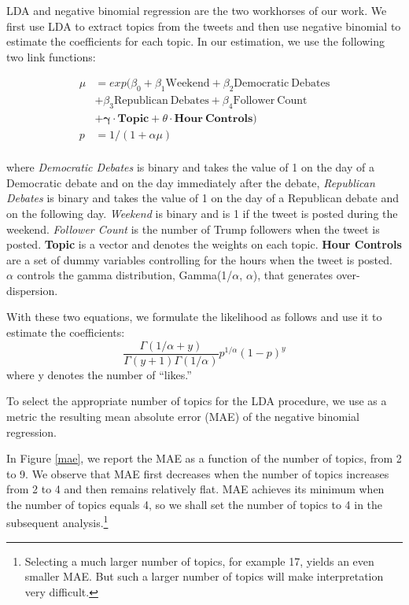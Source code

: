 \documentclass[letterpaper]{article}
\begin{document}
LDA and negative binomial regression are the two workhorses of our work. We first use LDA to extract topics from the tweets and then use negative binomial to estimate the coefficients for each topic. In our estimation, we use the following two link functions:

\begin{equation*} \label{eq1}
\begin{split}
\mu &=exp(\beta_0+ \beta_1\mathrm{Weekend}+\beta_2\mathrm{Democratic\: Debates}\\
 &+\beta_3\mathrm{Republican\: Debates}+\beta_4\mathrm{Follower\:Count}\\
 &+\pmb{\gamma}\cdot \mathbf{Topic}+\theta\cdot\mathbf{Hour\:Controls})\\
 p& =1/(1+\alpha\mu)\\
\end{split}
\end{equation*}

where \textit{Democratic Debates} is binary and takes the value of 1 on the day of a Democratic debate and on the day immediately after the debate, \textit{Republican Debates} is binary and takes the value of 1 on the day of a Republican debate and on the following day. \textit{Weekend} is binary and is 1 if the tweet is posted during the weekend. \textit{Follower Count} is the number of Trump followers when the tweet is posted. \textbf{Topic} is a vector and denotes the weights on each topic. \textbf{Hour Controls} are a set of dummy variables controlling for the hours when the tweet is posted. $\alpha$ controls the gamma distribution, Gamma(1/$\alpha$, $\alpha$), that generates over-dispersion.

With these two equations, we formulate the likelihood as follows and use it to estimate the coefficients:
\[\frac{\Gamma(1/\alpha+y)}{\Gamma(y+1)\Gamma(1/\alpha)}p^{1/\alpha}(1-p)^y\]
where y denotes the number of ``likes.''

To select the appropriate number of topics for the LDA procedure, we use as a metric the resulting mean absolute error (MAE) of the negative binomial regression.

In Figure \ref{mae}, we report the MAE as a function of the number of topics, from 2 to 9. We observe that MAE first decreases when the number of topics increases from 2 to 4 and then remains relatively flat. MAE achieves its minimum when the number of topics equals 4, so we shall set the number of topics to 4 in the subsequent analysis.\footnote{Selecting a much larger number of topics, for example 17, yields an even smaller MAE. But such a larger number of topics will make interpretation very difficult.}
\end{document}

